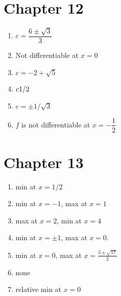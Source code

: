\section*{Chapter 12}
\twocol
\begin{enumerate}
    \item $c=\dfrac{6\pm \sqrt{3}}{3}$
    \item Not differentiable at $x=0$
    \item $c=-2+\sqrt{5}$
    \item $c\-1/2$
    \item $c=\pm 1/\sqrt{3}$
    \item $f$ is not differentiable at $x=-\dfrac{1}{2}$
\end{enumerate}
\endtwocol

\section*{Chapter 13}
\twocol
\begin{enumerate}
    \item min at $x=1/2$
    \item min at $x=-1$, max at $x=1$
    \item max at $x=2$, min at $x=4$
    \item min at $x=\pm 1$, max at $x=0$.
    \item min at $x=0$, max at $x=\frac{3\pm \sqrt{17}}{2}$
    \item none
    \item relative min at $x=0$
\end{enumerate}
\endtwocol

